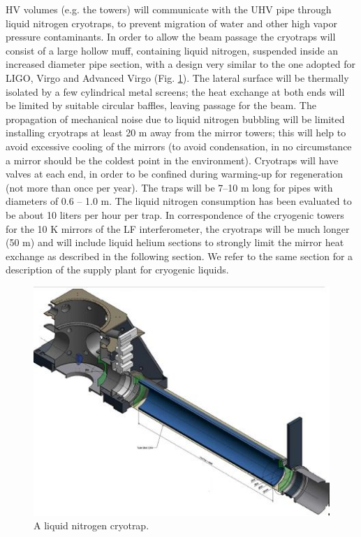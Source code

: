 HV volumes (e.g. the towers) will communicate with the UHV pipe through liquid nitrogen cryotraps, to prevent migration of water and other high vapor pressure contaminants. In order to allow the beam passage the cryotraps will consist of a large hollow muff, containing liquid nitrogen, suspended inside an increased diameter pipe section, with a design very similar to the one adopted for LIGO, Virgo and Advanced Virgo (Fig. \ref{fig:vac6}). The lateral surface will be thermally isolated by a few cylindrical metal screens; the heat exchange at both ends will be limited by suitable circular baffles, leaving passage for the beam. The propagation of mechanical noise due to liquid nitrogen bubbling will be limited installing cryotraps at least 20 m away from the mirror towers; this will help to avoid excessive cooling of the mirrors (to avoid condensation, in no circumstance a mirror should be the coldest point in the environment). Cryotraps will have valves at each end, in order to be confined during warming-up for regeneration (not more than once per year). The traps will be 7--10 m long for pipes with diameters of 0.6 -- 1.0 m. The liquid nitrogen consumption has been evaluated to be about 10 liters per hour per trap. In correspondence of the cryogenic towers for the 10 K mirrors of the LF interferometer, the cryotraps will be much longer (50 m) and will include liquid helium sections to strongly limit the mirror heat exchange as described in the following section. We refer to the same section for a description of the supply plant for cryogenic liquids.

\begin{figure}
\begin{center}
\includegraphics{Sec_SiteInfra/Figures/VAC6.jpg}
\caption{A liquid nitrogen cryotrap.}
\label{fig:vac6}
\end{center}
\end{figure}

